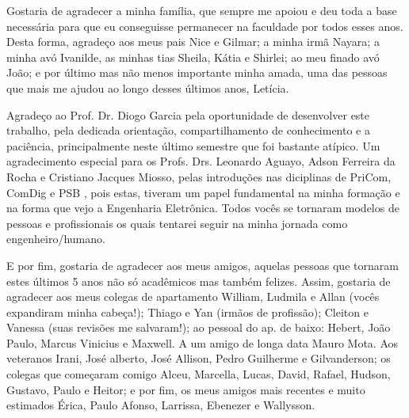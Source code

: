 \begin{agradecimentos}
Gostaria de agradecer a minha família, que sempre me apoiou e deu toda a base necessária para que eu conseguisse permanecer na faculdade por todos esses anos. Desta forma, agradeço aos meus pais Nice  e Gilmar; a minha irmã Nayara; a minha avó Ivanilde, as  minhas tias Sheila, Kátia e Shirlei; ao meu finado avó João; e por último mas não menos importante minha amada, uma das pessoas que mais me ajudou ao longo desses últimos anos, Letícia.

Agradeço ao Prof. Dr. Diogo Garcia pela oportunidade de desenvolver este trabalho, pela dedicada orientação, compartilhamento de conhecimento e a paciência, principalmente neste último semestre que foi bastante atípico. Um agradecimento especial para os Profs. Drs. Leonardo Aguayo, Adson Ferreira da Rocha e Cristiano Jacques Miosso, pelas introduções nas diciplinas de PriCom, ComDig e PSB , pois estas, tiveram um papel fundamental na minha formação e na forma que vejo a Engenharia Eletrônica. Todos vocês se tornaram modelos de pessoas e profissionais os quais tentarei seguir na minha jornada como  engenheiro/humano.

E por fim, gostaria de agradecer aos meus amigos, aquelas pessoas que tornaram estes últimos 5 anos não só acadêmicos mas também felizes. Assim, gostaria de agradecer aos meus colegas de  apartamento William, Ludmila e Allan (vocês expandiram minha cabeça!); Thiago e Yan (irmãos de profissão); Cleiton e Vanessa (suas revisões me salvaram!); ao pessoal do ap. de baixo: Hebert, João Paulo, Marcus Vinicius e Maxwell.  A um amigo de longa data Mauro Mota. Aos veteranos Irani, José alberto, José Allison, Pedro Guilherme e Gilvanderson; os colegas que começaram comigo  Alceu, Marcella, Lucas, David, Rafael, Hudson, Gustavo, Paulo e Heitor; e por fim, os meus amigos mais recentes e muito estimados Érica, Paulo Afonso, Larrissa, Ebenezer e Wallysson.
\end{agradecimentos}
